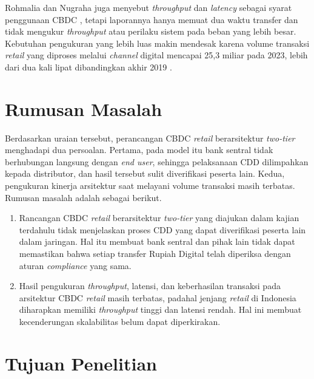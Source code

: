 Rohmalia dan Nugraha juga menyebut \textit{throughput} dan \textit{latency} sebagai syarat penggunaan CBDC \cite{rohmalia2023retail}, tetapi laporannya hanya memuat dua waktu transfer dan tidak mengukur \textit{throughput} atau perilaku sistem pada beban yang lebih besar. Kebutuhan pengukuran yang lebih luas makin mendesak karena volume transaksi \textit{retail} yang diproses melalui \textit{channel} digital mencapai 25,3 miliar pada 2023, lebih dari dua kali lipat dibandingkan akhir 2019 \cite{bi_bspi2030}.

\section{Rumusan Masalah}

Berdasarkan uraian tersebut, perancangan CBDC \textit{retail} berarsitektur \textit{two-tier} menghadapi dua persoalan. Pertama, pada model itu bank sentral tidak berhubungan langsung dengan \textit{end user}, sehingga pelaksanaan CDD dilimpahkan kepada distributor, dan hasil tersebut sulit diverifikasi peserta lain. Kedua, pengukuran kinerja arsitektur saat melayani volume transaksi masih terbatas. Rumusan masalah adalah sebagai berikut.
\begin{enumerate}
	\item Rancangan CBDC \textit{retail} berarsitektur \textit{two-tier} yang diajukan dalam kajian terdahulu tidak menjelaskan proses CDD yang dapat diverifikasi peserta lain dalam jaringan. Hal itu membuat bank sentral dan pihak lain tidak dapat memastikan bahwa setiap transfer Rupiah Digital telah diperiksa dengan aturan \textit{compliance} yang sama.
	\item Hasil pengukuran \textit{throughput}, latensi, dan keberhasilan transaksi pada arsitektur CBDC \textit{retail} masih terbatas, padahal jenjang \textit{retail} di Indonesia diharapkan memiliki \textit{throughput} tinggi dan latensi rendah. Hal ini membuat kecenderungan skalabilitas belum dapat diperkirakan.
\end{enumerate}

\section{Tujuan Penelitian}

